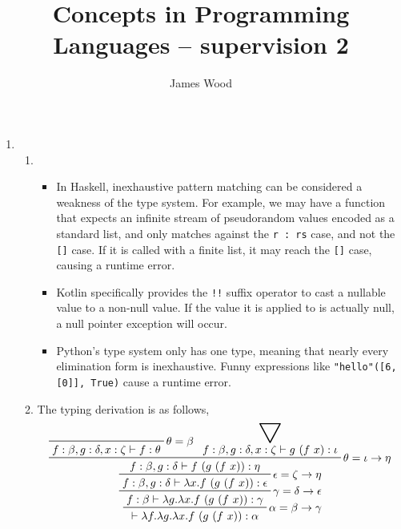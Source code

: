 \documentclass{article}
\begin{document}
\title{Concepts in Programming Languages -- supervision 2}
\author{James Wood}
\maketitle

\begin{enumerate}
  \item
    \begin{enumerate}
      \item
        \begin{itemize}
          \item In Haskell, inexhaustive pattern matching can be considered a weakness of the type system. For example, we may have a function that expects an infinite stream of pseudorandom values encoded as a standard list, and only matches against the \texttt{r : rs} case, and not the \texttt{[]} case. If it is called with a finite list, it may reach the \texttt{[]} case, causing a runtime error.
          \item Kotlin specifically provides the \texttt{!!} suffix operator to cast a nullable value to a non-null value. If the value it is applied to is actually null, a null pointer exception will occur.
          \item Python's type system only has one type, meaning that nearly every elimination form is inexhaustive. Funny expressions like \texttt{"hello"([6, [0]], True)} cause a runtime error.
        \end{itemize}
      \item
        The typing derivation is as follows,
        \begin{displaymath}
          \prftree[r]{$\alpha = \beta \to \gamma$}{
            \prftree[r]{$\gamma = \delta \to \epsilon$}{
              \prftree[r]{$\epsilon = \zeta \to \eta$}{
                \prftree[r]{$\theta = \iota \to \eta$}{
                  \prftree[r]{$\theta = \beta$}{
                    f : \beta, g : \delta, x : \zeta \vdash f : \theta
                  }
                }{
                  \prfsummarystyle=4
                  \prfsummary{
                    f : \beta, g : \delta, x : \zeta \vdash g~(f~x) : \iota
                  }
                }{f : \beta, g : \delta \vdash f~(g~(f~x)) : \eta}
              }{f : \beta, g : \delta \vdash \lambda x. f~(g~(f~x)) : \epsilon}
            }{f : \beta \vdash \lambda g. \lambda x. f~(g~(f~x)) : \gamma}
          }{\vdash \lambda f. \lambda g. \lambda x. f~(g~(f~x)) : \alpha}
        \end{displaymath}

\end{enumerate}
\end{enumerate}
\end{document}
